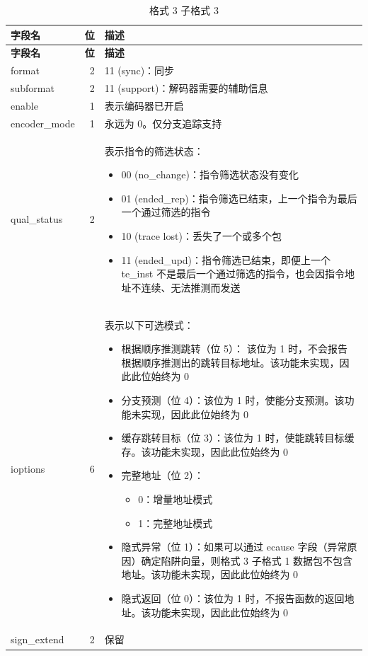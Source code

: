 \documentclass[main\_\_CN.tex]{subfiles}
\begin{document}
\begin{longtable}[c]{ |l|r|L{10cm}| }
    \caption{格式 3 子格式 3}
    \label{tab:f3s3}
    \\\hline{}
    \textbf{字段名} & \textbf{位} & \textbf{描述} \\\hline
    \endfirsthead

    \hline
    \textbf{字段名} & \textbf{位} & \textbf{描述} \\\hline
    \endhead
    \endfoot
    \endlastfoot

    format & 2 & 11 (sync)：同步 \\\hline
    subformat & 2 & 11 (support)：解码器需要的辅助信息 \\\hline
    enable & 1 & 表示编码器已开启 \\\hline
    encoder\_mode & 1 & 永远为 0。仅分支追踪支持 \\\hline
    qual\_status & 2 & 表示指令的筛选状态：
    \begin{itemize}
        \item 00 (no\_change)：指令筛选状态没有变化
        \item 01 (ended\_rep)：指令筛选已结束，上一个指令为最后一个通过筛选的指令
        \item 10 (trace lost)：丢失了一个或多个包
        \item 11 (ended\_upd)：指令筛选已结束，即便上一个 te\_inst 不是最后一个通过筛选的指令，也会因指令地址不连续、无法推测而发送
        \vspace{-1.5em}
    \end{itemize}
    \\\hline
    ioptions & 6 & 表示以下可选模式：
    \begin{itemize}
        \item 根据顺序推测跳转（位 5）： 该位为 1 时，不会报告根据顺序推测出的跳转目标地址。该功能未实现，因此此位始终为 0
        \item 分支预测（位 4）：该位为 1 时，使能分支预测。该功能未实现，因此此位始终为 0
        \item 缓存跳转目标（位 3）：该位为 1 时，使能跳转目标缓存。该功能未实现，因此此位始终为 0
        \item 完整地址（位 2）：
        \begin{itemize}
            \item 0：增量地址模式
            \item 1：完整地址模式
        \end{itemize}
        \item 隐式异常（位 1）：如果可以通过 ecause 字段（异常原因）确定陷阱向量，则格式 3 子格式 1 数据包不包含地址。该功能未实现，因此此位始终为 0
        \item 隐式返回（位 0）：该位为 1 时，不报告函数的返回地址。该功能未实现，因此此位始终为 0
    \end{itemize}
    \\\hline
    sign\_extend & 2 & 保留 \\\hline

 \end{longtable}
\end{document}
